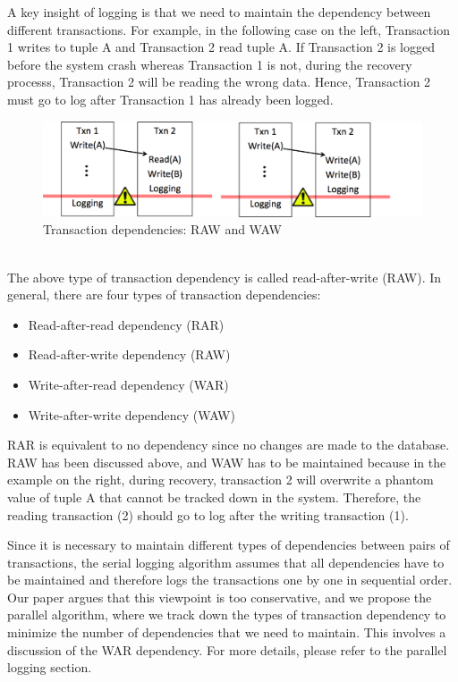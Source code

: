 A key insight of logging is that we need to maintain the dependency between different transactions. For example, in the following case on the left, Transaction 1 writes to tuple A and Transaction 2 read tuple A. If Transaction 2 is logged before the system crash whereas Transaction 1 is not, during the recovery processs, Transaction 2 will be reading the wrong data. Hence, Transaction 2 must go to log after Transaction 1 has already been logged. 
\begin{figure}[!h]
\caption{Transaction dependencies: RAW and WAW}
\includegraphics[width=\textwidth]{DepExample.jpeg}
\end{figure}\\
The above type of transaction dependency is called read-after-write (RAW). In general, there are four types of transaction dependencies:
\begin{itemize}
\item Read-after-read dependency (RAR)
\item Read-after-write dependency (RAW)
\item Write-after-read dependency (WAR)
\item Write-after-write dependency (WAW)
\end{itemize}
RAR is equivalent to no dependency since no changes are made to the database. RAW has been discussed above, and WAW has to be maintained because in the example on the right, during recovery, transaction 2 will overwrite a phantom value of tuple A that cannot be tracked down in the system. Therefore, the reading transaction (2) should go to log after the writing transaction (1).\par
Since it is necessary to maintain different types of dependencies between pairs of transactions, the serial logging algorithm assumes that all dependencies have to be maintained and therefore logs the transactions one by one in sequential order. Our paper argues that this viewpoint is too conservative, and we propose the parallel algorithm, where we track down the types of transaction dependency to minimize the number of dependencies that we need to maintain. This involves a discussion of the WAR dependency. For more details, please refer to the parallel logging section. \par

